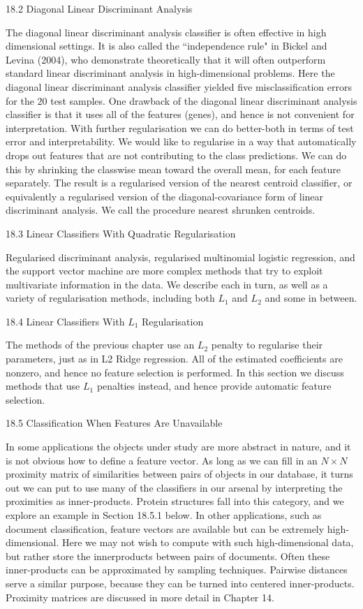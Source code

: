18.2 Diagonal Linear Discriminant Analysis

The diagonal linear discriminant analysis classifier is often effective in high dimensional settings. It is also called the ``independence rule" in Bickel and Levina (2004), who demonstrate theoretically that it will often outperform standard linear discriminant analysis in high-dimensional problems. Here the diagonal linear discriminant analysis classifier yielded five misclassification errors for the $20$ test samples. One drawback of the diagonal linear discriminant analysis classifier is that it uses all of the features (genes), and hence is not convenient for interpretation. With further regularisation we can do better-both in terms of test error and interpretability. We would like to regularise in a way that automatically drops out features that are not contributing to the class predictions. We can do this by shrinking the classwise mean toward the overall mean, for each feature separately. The result is a regularised version of the nearest centroid classifier, or equivalently a regularised version of the diagonal-covariance form of linear discriminant analysis. We call the procedure nearest shrunken centroids.

18.3 Linear Classifiers With Quadratic Regularisation

Regularised discriminant analysis, regularised multinomial logistic regression, and the support vector machine are more complex methods that try to exploit multivariate information in the data. We describe each in turn, as well as a variety of regularisation methods, including both $L_1$ and $L_2$ and some in between.

18.4 Linear Classifiers With $L_1$ Regularisation

The methods of the previous chapter use an $L_2$ penalty to regularise their parameters, just as in L2 Ridge regression. All of the estimated coefficients are nonzero, and hence no feature selection is performed. In this section we discuss methods that use $L_1$ penalties instead, and hence provide automatic feature selection.

18.5 Classification When Features Are Unavailable

In some applications the objects under study are more abstract in nature, and it is not obvious how to define a feature vector. As long as we can fill in an $N \times N$ proximity matrix of similarities between pairs of objects in our database, it turns out we can put to use many of the classifiers in our arsenal by interpreting the proximities as inner-products. Protein structures fall into this category, and we explore an example in Section 18.5.1 below. In other applications, such as document classification, feature vectors are available but can be extremely high-dimensional. Here we may not wish to compute with such high-dimensional data, but rather store the innerproducts between pairs of documents. Often these inner-products can be approximated by sampling techniques. Pairwise distances serve a similar purpose, because they can be turned into centered inner-products. Proximity matrices are discussed in more detail in Chapter 14.

